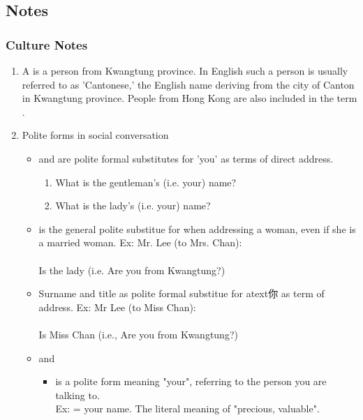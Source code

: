 \subsection{Notes}

\subsubsection{Culture Notes}

\begin{enumerate}
\item A  is a person from Kwangtung province. In English
such a person is usually referred to as 'Cantonese,' the English
name deriving from the city of Canton in Kwangtung province.
People from Hong Kong are also included in the term .
\item Polite forms in social conversation
    \begin{itemize}
    \item {} and  are polite formal substitutes for  'you' as terms of direct address.
        \begin{enumerate}
            \item {} What is the gentleman's (i.e. your) name?
            \item {} What is the lady's (i.e. your) name?
        \end{enumerate}
    \item {} is the general polite substitue for  when addressing a woman, even if she is a married woman. Ex: Mr. Lee (to Mrs. Chan):\\
    \\
    Is the lady (i.e. Are you from Kwangtung?)

    \item Surname and title as polite formal substitue for atext{你} as term of address. Ex: Mr Lee (to Miss Chan):\\
    \\
    Is Miss Chan (i.e., Are you from Kwangtung?)

    \item {} and 
        \begin{itemize}
            \item {} is a polite form meaning "your", referring to the person you are talking to.\\
            Ex:  = your name. The literal meaning of  "precious, valuable".


\end{itemize}
\end{itemize}
\end{enumerate}
